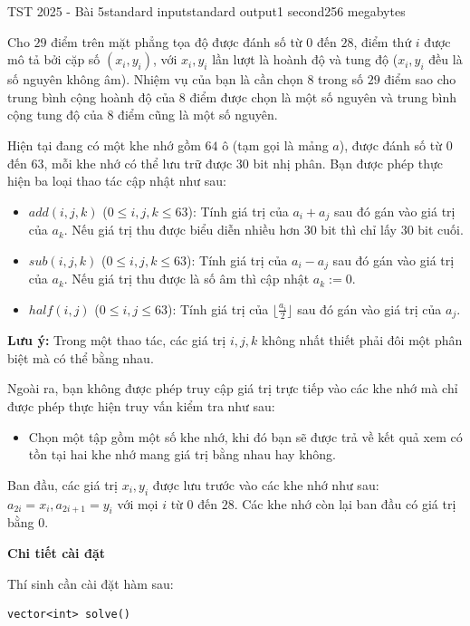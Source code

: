 \begin{problem}{TST 2025 - Bài 5}{standard input}{standard output}{1 second}{256 megabytes}

Cho $29$ điểm trên mặt phẳng tọa độ được đánh số từ $0$ đến $28$, điểm thứ $i$ được mô tả bởi cặp số $(x_i,y_i)$, với $x_i,y_i$ lần lượt là hoành độ và tung độ ($x_i,y_i$ đều là số nguyên không âm). Nhiệm vụ của bạn là cần chọn $8$ trong số $29$ điểm sao cho trung bình cộng hoành độ của $8$ điểm được chọn là một số nguyên và trung bình cộng tung độ của $8$ điểm cũng là một số nguyên.

Hiện tại đang có một khe nhớ gồm $64$ ô (tạm gọi là mảng $a$), được đánh số từ $0$ đến $63$, mỗi khe nhớ có thể lưu trữ được $30$ bit nhị phân. Bạn được phép thực hiện ba loại thao tác cập nhật như sau:
\begin{itemize}
  \item $add(i,j,k)$ ($0\le i,j,k\le 63$): Tính giá trị của $a_i+a_j$ sau đó gán vào giá trị của $a_k$. Nếu giá trị thu được biểu diễn nhiều hơn $30$ bit thì chỉ lấy $30$ bit cuối.
  \item $sub(i,j,k)$ ($0\le i,j,k\le 63$): Tính giá trị của $a_i-a_j$ sau đó gán vào giá trị của $a_k$. Nếu giá trị thu được là số âm thì cập nhật $a_k:=0$.
  \item $half(i,j)$ ($0\le i,j\le 63$): Tính giá trị của $\lfloor \frac{a_i}2 \rfloor$ sau đó gán vào giá trị của $a_j$.
\end{itemize}

\textbf{Lưu ý:} Trong một thao tác, các giá trị $i,j,k$ không nhất thiết phải đôi một phân biệt mà có thể bằng nhau.

Ngoài ra, bạn không được phép truy cập giá trị trực tiếp vào các khe nhớ mà chỉ được phép thực hiện truy vấn kiểm tra như sau:
\begin{itemize}
   \item Chọn một tập gồm một số khe nhớ, khi đó bạn sẽ được trả về kết quả xem có tồn tại hai khe nhớ mang giá trị bằng nhau hay không.
\end{itemize}

Ban đầu, các giá trị $x_i,y_i$ được lưu trước vào các khe nhớ như sau: $a_{2i}=x_i,a_{2i+1}=y_i$ với mọi $i$ từ $0$ đến $28$. Các khe nhớ còn lại ban đầu có giá trị bằng $0$.

\InputFile
\textbf{Chi tiết cài đặt}

Thí sinh cần cài đặt hàm sau:

\begin{lstlisting}
vector<int> solve()
\end{lstlisting}


\end{problem}
